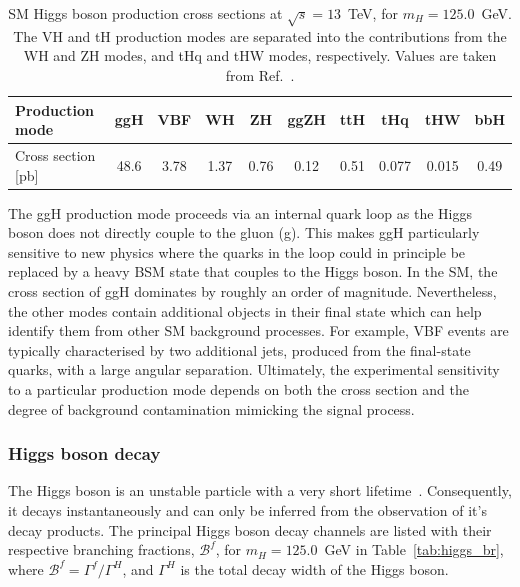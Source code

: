 \begin{table}[htb]
    \caption[Higgs boson production cross sections]{SM Higgs boson production cross sections at $\sqrt{s}=13$~TeV, for $m_H=125.0$~GeV. The VH and tH production modes are separated into the contributions from the WH and ZH modes, and tHq and tHW modes, respectively. Values are taken from Ref.~\cite{deFlorian:2016spz}.}
    \label{tab:higgs_xs}
    \centering
    \footnotesize
    \setlength{\tabcolsep}{8pt}
    \renewcommand{\arraystretch}{2}
    \begin{tabular}{l|c|c|c|c|c|c|c|c|c}
        Production mode & ggH & VBF & WH & ZH & ggZH & ttH & tHq & tHW & bbH   \\ \hline
        Cross section [pb] & 48.6 & 3.78 & 1.37 & 0.76 & 0.12 & 0.51 & 0.077 & 0.015 & 0.49 \\
    \end{tabular}
\end{table}

The ggH production mode proceeds via an internal quark loop as the Higgs boson does not directly couple to the gluon (g). This makes ggH particularly sensitive to new physics where the quarks in the loop could in principle be replaced by a heavy BSM state that couples to the Higgs boson. In the SM, the cross section of ggH dominates by roughly an order of magnitude. Nevertheless, the other modes contain additional objects in their final state which can help identify them from other SM background processes. For example, VBF events are typically characterised by two additional jets, produced from the final-state quarks, with a large angular separation. Ultimately, the experimental sensitivity to a particular production mode depends on both the cross section and the degree of background contamination mimicking the signal process.

\subsubsection{Higgs boson decay}
The Higgs boson is an unstable particle with a very short lifetime~\cite{Zyla:2020zbs}. Consequently, it decays instantaneously and can only be inferred from the observation of it's decay products. The principal Higgs boson decay channels are listed with their respective branching fractions, $\mathcal{B}^f$, for $m_H=125.0$~GeV in Table~\ref{tab:higgs_br}, where $\mathcal{B}^f=\Gamma^f/\Gamma^H$, and $\Gamma^H$ is the total decay width of the Higgs boson.

